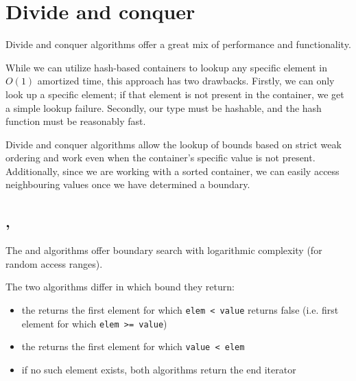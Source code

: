 \section{Divide and conquer}

Divide and conquer algorithms offer a great mix of performance and functionality.

While we can utilize hash-based containers to lookup any specific element in $O(1)$ amortized time, this approach has two drawbacks. Firstly, we can only look up a specific element; if that element is not present in the container, we get a simple lookup failure. Secondly, our type must be hashable, and the hash function must be reasonably fast.

Divide and conquer algorithms allow the lookup of bounds based on strict weak ordering and work even when the container’s specific value is not present. Additionally, since we are working with a sorted container, we can easily access neighbouring values once we have determined a boundary.

\subsection{\texorpdfstring{, }{\texttt{std::lower\_bound}, \texttt{std::upper\_bound}}}

The  and  algorithms offer boundary search with logarithmic complexity (for random access ranges).


\noindent The two algorithms differ in which bound they return:

\begin{itemize}
    \item the  returns the first element for which \texttt{elem < value} returns false (i.e. first element for which \texttt{elem >= value})
    \item the  returns the first element for which \texttt{value < elem}
    \item if no such element exists, both algorithms return the end iterator
\end{itemize}

